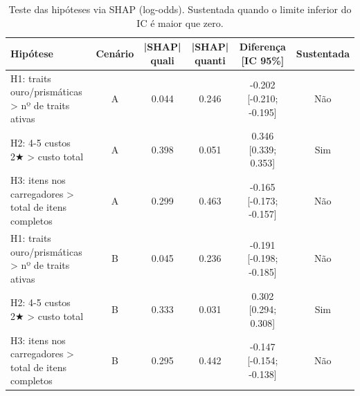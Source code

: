 \begin{table}[htbp]
\caption{Teste das hipóteses via SHAP (log-odds). Sustentada quando o limite inferior do IC é maior que zero.}
\label{tab:hipoteses}
\centering
\small
\begin{tabular}{lccccc}
\toprule
Hipótese & Cenário & |SHAP| quali & |SHAP| quanti & Diferença [IC 95\%] & Sustentada \\
\midrule
H1: traits ouro/prismáticas > nº de traits ativas & A & 0.044 & 0.246 & -0.202 [-0.210; -0.195] & Não \\
H2: 4-5 custos 2★ > custo total & A & 0.398 & 0.051 & 0.346 [0.339; 0.353] & Sim \\
H3: itens nos carregadores > total de itens completos & A & 0.299 & 0.463 & -0.165 [-0.173; -0.157] & Não \\
H1: traits ouro/prismáticas > nº de traits ativas & B & 0.045 & 0.236 & -0.191 [-0.198; -0.185] & Não \\
H2: 4-5 custos 2★ > custo total & B & 0.333 & 0.031 & 0.302 [0.294; 0.308] & Sim \\
H3: itens nos carregadores > total de itens completos & B & 0.295 & 0.442 & -0.147 [-0.154; -0.138] & Não \\
\bottomrule
\end{tabular}
\end{table}
